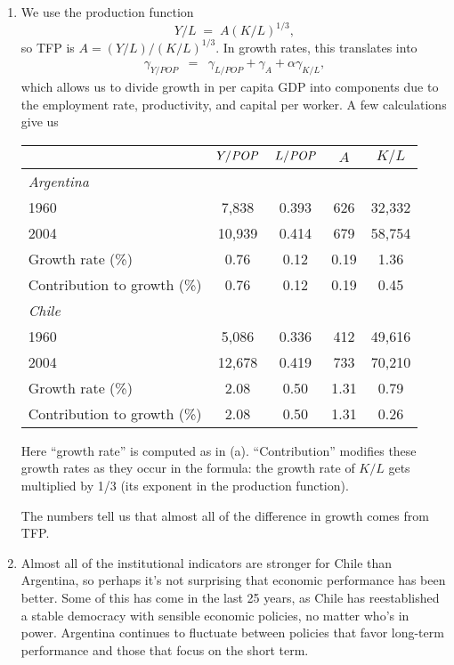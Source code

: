 \documentclass[letterpaper,12pt]{article}
\newcommand{\POP}{\mbox{\it POP\/}}
\begin{document}
\begin{enumerate}
\begin{enumerate}
\item We use the production function 
\[
    Y/L \;=\; A (K/L)^{1/3} ,
\]
so TFP is $ A = (Y/L) / (K/L)^{1/3}  $. 
In growth rates, this translates into 
\begin{eqnarray*}
    \gamma_{Y/POP} &=&  \gamma_{L/POP}  + \gamma_A 
                + \alpha \gamma_{K/L}  ,
\end{eqnarray*}
which allows us to divide growth in per capita GDP into 
components due to the employment rate, productivity, 
and capital per worker.  
A few calculations give us 
%
\begin{center}
\begin{tabular}{lcccc}
\hline\hline
            &  $Y/\POP$      &  $L/\POP$    &   $A$   &  $K/L$     \\
\hline\hline
\multicolumn{5}{l}{\it Argentina} \\
1960        &    7,838    &  0.393  &   626  &  32,332      \\
2004        &    10,939\phantom{1}   
                          &  0.414  &   679  &  58,754    \\
Growth rate (\%) &  0.76  &  0.12   &   0.19 &  1.36   \\
Contribution to growth (\%) 
                &   0.76  &  0.12   &   0.19 &  0.45  \\
\hline                 
\multicolumn{5}{l}{\it Chile} \\
1960        &    5,086    &  0.336   &  412  & 49,616      \\
2004        &    12,678\phantom{1}
                          &  0.419   &  733  & 70,210    \\
Growth rate (\%) &  2.08  &  0.50   &   1.31 &   0.79   \\
Contribution to growth (\%) 
                &   2.08  &  0.50   &  1.31  &   0.26  \\
\hline\hline
\end{tabular}
\end{center}
Here ``growth rate'' is computed as in (a).
``Contribution'' modifies these growth
rates as they occur in the formula:  the growth rate of $K/L$ gets
multiplied by 1/3 (its exponent in the production function).

The numbers tell us that almost all of the difference in growth 
comes from TFP.  

\item Almost all of the institutional indicators are stronger for Chile
than Argentina, so perhaps it's not surprising that economic performance
has been better.  
Some of this has come in the last 25 years, as Chile has reestablished a 
stable democracy with sensible economic policies, no matter who's in power.
Argentina continues to fluctuate between policies that favor long-term 
performance and those that focus on the short term.  


\end{enumerate}
\end{enumerate}
\end{document}
